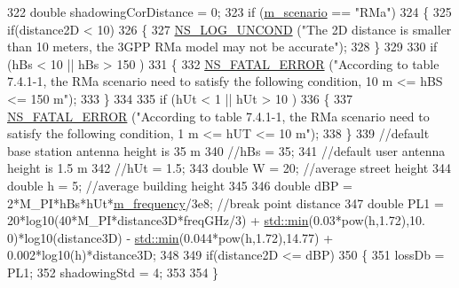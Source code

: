 \begin{DoxyCode}
322         \textcolor{keywordtype}{double} shadowingCorDistance = 0;
323         \textcolor{keywordflow}{if} (\hyperlink{classMmWave3gppPropagationLossModel_a3ba2b9e45f4d02e49620faf03f97e898}{m\_scenario} == \textcolor{stringliteral}{"RMa"})
324         \{
325                 \textcolor{keywordflow}{if}(distance2D < 10)
326                 \{
327                         \hyperlink{log-macros-disabled_8h_a0b36e5e182b37194f85ef1c5e979fb2e}{NS\_LOG\_UNCOND} (\textcolor{stringliteral}{"The 2D distance is smaller than 10 meters, the 3GPP
       RMa model may not be accurate"});
328                 \}
329 
330                 \textcolor{keywordflow}{if} (hBs < 10 || hBs > 150 )
331                 \{
332                         \hyperlink{group__fatal_ga5131d5e3f75d7d4cbfd706ac456fdc85}{NS\_FATAL\_ERROR} (\textcolor{stringliteral}{"According to table 7.4.1-1, the RMa scenario need to
       satisfy the following condition, 10 m <= hBS <= 150 m"});
333                 \}
334 
335                 \textcolor{keywordflow}{if} (hUt < 1 || hUt > 10 )
336                 \{
337                         \hyperlink{group__fatal_ga5131d5e3f75d7d4cbfd706ac456fdc85}{NS\_FATAL\_ERROR} (\textcolor{stringliteral}{"According to table 7.4.1-1, the RMa scenario need to
       satisfy the following condition, 1 m <= hUT <= 10 m"});
338                 \}
339                 \textcolor{comment}{//default base station antenna height is 35 m}
340                 \textcolor{comment}{//hBs = 35;}
341                 \textcolor{comment}{//default user antenna height is 1.5 m}
342                 \textcolor{comment}{//hUt = 1.5;}
343                 \textcolor{keywordtype}{double} W = 20; \textcolor{comment}{//average street height}
344                 \textcolor{keywordtype}{double} h = 5; \textcolor{comment}{//average building height}
345 
346                 \textcolor{keywordtype}{double} dBP = 2*M\_PI*hBs*hUt*\hyperlink{classMmWave3gppPropagationLossModel_a2e61a4ea86089b9f974dbbb5180f9c86}{m\_frequency}/3e8; \textcolor{comment}{//break point distance}
347                 \textcolor{keywordtype}{double} PL1 = 20*log10(40*M\_PI*distance3D*freqGHz/3) + \hyperlink{80211b_8c_ac6afabdc09a49a433ee19d8a9486056d}{std::min}(0.03*pow(h,1.72),10.
      0)*log10(distance3D) - \hyperlink{80211b_8c_ac6afabdc09a49a433ee19d8a9486056d}{std::min}(0.044*pow(h,1.72),14.77) + 0.002*log10(h)*distance3D;
348 
349                 \textcolor{keywordflow}{if}(distance2D <= dBP)
350                 \{
351                         lossDb = PL1;
352                         shadowingStd = 4;
353 
354                 \}

\end{DoxyCode}
